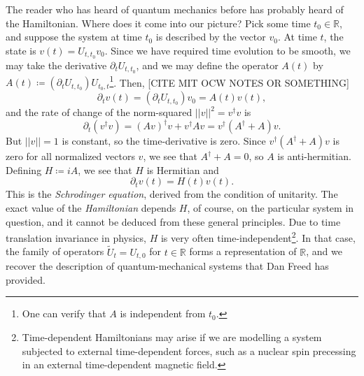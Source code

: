 \documentclass{amsart}
\newcommand{\R}{\mathbb{R}}
\newcommand{\pd}{\partial}
\begin{document}
The reader who has heard of quantum mechanics before has probably heard of the Hamiltonian. Where does it come into our picture? Pick some time $t_0 \in \R$, and suppose the system at time $t_0$ is described by the vector $v_0$. At time $t$, the state is $v(t) = U_{t, t_0}v_0$. Since we have required time evolution to be smooth, we may take the derivative $\pd_t U_{t, t_0}$, and we may define the operator $A(t)$ by $A(t) \coloneqq \left(\pd_t U_{t, t_0}\right)U_{t_0, t}$\footnote{One can verify that $A$ is independent from $t_0$.}. Then, [CITE MIT OCW NOTES OR SOMETHING]
\begin{equation*}
    \pd_t v(t) = \left(\pd_t U_{t, t_0}\right) v_0 = A(t) v(t),
\end{equation*}
and the rate of change of the norm-squared $||v||^2 = v^\dag v$ is
\begin{equation*}
    \pd_t \left(v^\dag v\right) = (A v)^\dag v + v^\dag A v = v^\dag(A^\dag + A) v.
\end{equation*}
But $||v|| = 1$ is constant, so the time-derivative is zero. Since $v^\dag(A^\dag + A) v$ is zero for all normalized vectors $v$, we see that $A^\dag + A = 0$, so $A$ is anti-hermitian. Defining $H \coloneqq i A$, we see that $H$ is Hermitian and
\begin{equation*}
    \pd_t v(t) = H(t) v(t).
\end{equation*}
This is the \emph{Schrodinger equation}, derived from the condition of unitarity. The exact value of the \emph{Hamiltonian} depends $H$, of course, on the particular system in question, and it cannot be deduced from these general principles. Due to time translation invariance in physics, $H$ is very often time-independent\footnote{Time-dependent Hamiltonians may arise if we are modelling a system subjected to external time-dependent forces, such as a nuclear spin precessing in an external time-dependent magnetic field.}. In that case, the family of operators $\tilde U_t = U_{t, 0}$ for $t \in \R$ forms a representation of $\R$, and we recover the description of quantum-mechanical systems that Dan Freed has provided.


\nocite{*}
\printbibliography
\end{document}
